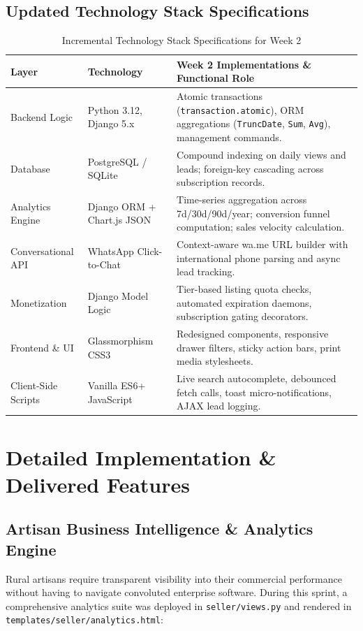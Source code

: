 \documentclass[12pt,a4paper]{article}
\begin{document}
\subsection{Updated Technology Stack Specifications}
\begin{table}[h]
\centering
\small
\begin{tabularx}{\textwidth}{l p{3.8cm} X}
\toprule
\textbf{Layer} & \textbf{Technology} & \textbf{Week 2 Implementations \& Functional Role} \\
\midrule
Backend Logic & Python 3.12, Django 5.x & Atomic transactions (\texttt{transaction.atomic}), ORM aggregations (\texttt{TruncDate}, \texttt{Sum}, \texttt{Avg}), management commands. \\
Database & PostgreSQL / SQLite & Compound indexing on daily views and leads; foreign-key cascading across subscription records. \\
Analytics Engine & Django ORM + Chart.js JSON & Time-series aggregation across 7d/30d/90d/year; conversion funnel computation; sales velocity calculation. \\
Conversational API & WhatsApp Click-to-Chat & Context-aware wa.me URL builder with international phone parsing and async lead tracking. \\
Monetization & Django Model Logic & Tier-based listing quota checks, automated expiration daemons, subscription gating decorators. \\
Frontend \& UI & Glassmorphism CSS3 & Redesigned components, responsive drawer filters, sticky action bars, print media stylesheets. \\
Client-Side Scripts & Vanilla ES6+ JavaScript & Live search autocomplete, debounced fetch calls, toast micro-notifications, AJAX lead logging. \\
\bottomrule
\end{tabularx}
\caption{Incremental Technology Stack Specifications for Week 2}
\label{tab:week2_tech_stack}
\end{table}

\section{Detailed Implementation \& Delivered Features}

\subsection{Artisan Business Intelligence \& Analytics Engine}
Rural artisans require transparent visibility into their commercial performance without having to navigate convoluted enterprise software. During this sprint, a comprehensive analytics suite was deployed in \texttt{seller/views.py} and rendered in \texttt{templates/seller/analytics.html}:
\end{document}
